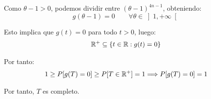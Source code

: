 \begin{ejercicio}[Reto]
    Como $\theta-1>0$, podemos dividir entre $(\theta-1)^{4n-1}$, obteniendo:
    \begin{equation*}
        g(\theta-1) = 0 \qquad \forall \theta \in \left]1,+\infty\right[
    \end{equation*}

    Esto implica que $g(t) = 0$ para todo $t>0$, luego:
    \begin{equation*}
        \mathbb{R}^+ \subseteq \{t\in \mathbb{R} : g(t) = 0\}
    \end{equation*}

    Por tanto:
    \begin{equation*}
        1 \geq P[g(T) = 0] \geq P[T \in \mathbb{R}^+] = 1 \Longrightarrow P[g(T) = 0] = 1
    \end{equation*}

    Por tanto, $T$ es completo.
\end{ejercicio}